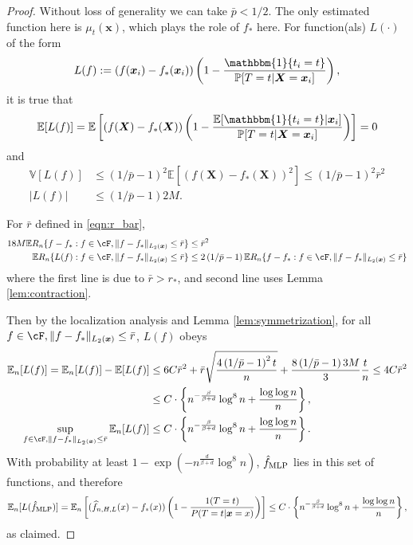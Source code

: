 \documentclass[11pt]{article}
\numberwithin{equation}{section}
\theoremstyle{definition}
\newcommand{\E}{\mathbb{E}}
\newcommand{\V}{\mathbb{V}}
\renewcommand{\P}{\mathbb{P}}
\newcommand{\One}{\mathbbm{1}}
\newcommand{\deq}{:=}
\newcommand{\bx}{\bm{x}}
\newcommand{\bX}{\bm{X}}
\begin{document}
\begin{appendices}
\begin{proof}%
	Without loss of generality we can take $\bar{p}<1/2$. The only estimated function here is $\mu_t(\bx)$, which plays the role of $f_*$ here. For function(als) $L(\cdot)$ of the form
	\begin{align*}
		L(f) \deq (f(\bx_i) - f_*(\bx_i)) \left(1 - \frac{\One\{t_i=t\} }{ \P[T=t\vert\bX = \bx_i]}\right),
	\end{align*}
	it is true that 
	\begin{align*}
		\E [L(f)] = \E \left[  \left( f(\bX) - f_*(\bX) \right) \left( 1 - \frac{\E [ \One\{t_i=t\} \vert \bx_i] }{ \P[T=t\vert\bX = \bx_i]} \right) \right] = 0
	\end{align*}
	and
	\begin{align*}
		\V[L(f)] &\leq \left(1/\bar{p} - 1 \right)^2 \E \left[ \left( f(\bX) - f_*(\bX) \right)^2 \right] \leq \left(1/\bar{p} - 1 \right)^2 \bar{r}^2 \\
		|L(f)| &\leq \left(1/\bar{p} - 1 \right) 2M.
	\end{align*}
	
	For $\bar{r}$ defined in \eqref{eqn:r_bar},
	\begin{align*}
		18M \E R_n \{ f - f_*: f \in \cF, \|f - f_* \|_{L_2(\bx)} \leq \bar{r} \} &\leq \bar{r}^2 \\
		\E R_n \{ L(f): f \in \cF, \|f - f_* \|_{L_2(\bx)} \leq \bar{r} \}& \leq 2 \left(1/\bar{p} - 1 \right) \E R_n \{ f - f_*: f \in \cF, \|f - f_* \|_{L_2(\bx)} \leq \bar{r} \}
	\end{align*}
	where the first line is due to $\bar{r} > r_*$, and second line uses Lemma \ref{lem:contraction}.


	Then by the localization analysis and Lemma \ref{lem:symmetrization}, for all $f \in \cF, \|f - f_* \|_{L_2(\bx)} \leq \bar{r}$, $L(f)$ obeys 
	\begin{align*}
		 \E_n [L(f)] = \E_n [L(f)] - \E [L(f)] & \leq 6 C \bar{r}^2 + \bar{r} \sqrt{\frac{4 \left(1/\bar{p} - 1 \right)^2 t}{n}} + \frac{8 \left(1/\bar{p} - 1 \right) 3M}{3} \frac{t}{n}  \leq 4C \bar{r}^2 \\
		&\leq  C \cdot \left\{ n^{-\frac{\beta}{\beta+d}} \log^8 n + \frac{\log \log n}{n} \right\},\\
		\sup_{f \in \cF, \|f - f_* \|_{L_2(\bx)} \leq \bar{r}} \E_n[L(f)] &\leq C \cdot \left\{ n^{-\frac{\beta}{\beta+d}} \log^8 n + \frac{\log \log n}{n} \right\}.
	\end{align*}
	With probability at least $1 - \exp(-n^{\frac{d}{\beta+d}} \log^8 n)$, $\hat{f}_{\rm MLP}$ lies in this set of functions, and therefore
	\[
		\E_n [ L(\hat{f}_{\rm MLP}) ] = \E_n \left[ (\widehat{f}_{n,H,L}(x) - f_*(x))\left( 1 - \frac{1(T=t)}{P(T = t|\bx = x)} \right)  \right] \leq  C \cdot \left\{ n^{-\frac{\beta}{\beta+d}} \log^8 n + \frac{\log \log n}{n} \right\},
	\]
	as claimed.		
\end{proof}







\end{appendices}
\end{document}
